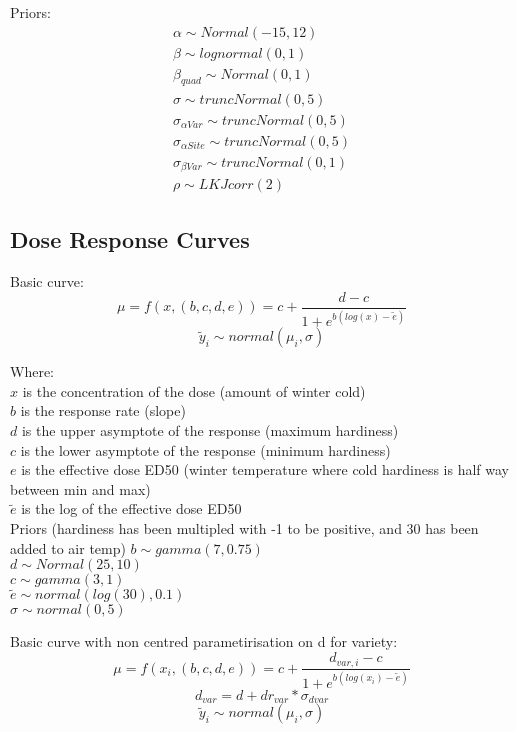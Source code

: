\documentclass[11pt,letter]{article}
\begin{document}
Priors:
\begin{gather*}
\alpha \sim Normal(-15, 12)\\
\beta \sim lognormal(0,1)\\
\beta_{quad} \sim Normal(0,1)\\
\sigma \sim truncNormal(0,5)\\
\sigma_{\alpha Var} \sim truncNormal(0,5)\\
\sigma_{\alpha Site} \sim truncNormal(0,5)\\
\sigma_{\beta Var} \sim truncNormal(0,1)\\
\rho \sim LKJcorr (2)
\end{gather*}

\subsection{Dose Response Curves}

Basic curve:
\begin{equation*}
\mu=f(x,(b,c,d,e))=c+\frac{d-c}{1+e^{b(log(x)-\tilde{e})}}
\end{equation*}
\begin{equation*}
\tilde{y}_{i}\sim normal(\mu_{i},\sigma)
\end{equation*}

Where:\\
	$x$ is the concentration of the dose (amount of winter cold) \\
	$b$ is the response rate (slope)\\
	$d$ is the upper asymptote of the response (maximum hardiness)\\
	$c$ is the lower asymptote of the response (minimum hardiness)\\{}
	$e$ is the effective dose ED50 (winter temperature where cold hardiness is half way between min and max)  \\
	$\tilde{e}$ is the log of the effective dose ED50\\

Priors (hardiness has been multipled with -1 to be positive, and 30 has been added to air temp)
	$b \sim gamma(7,0.75)$\\
	$d \sim Normal(25, 10)$ \\
	$c \sim gamma(3,1)$\\
	$\tilde{e} \sim normal(log(30), 0.1)$ \\
	$\sigma \sim normal(0,5)${}

Basic curve with non centred parametirisation on d for variety:
\begin{equation*}
\mu=f(x_{i},(b,c,d,e))=c+\frac{d_{var,i}-c}{1+e^{b(log(x_{i})-\tilde{e})}}
\end{equation*}
\begin{equation*}
{d}_{var} = d + dr_{var} * \sigma_{dvar}
\end{equation*}
\begin{equation*}
\tilde{y}_{i}\sim normal(\mu_{i},\sigma)
\end{equation*}
\end{document}
